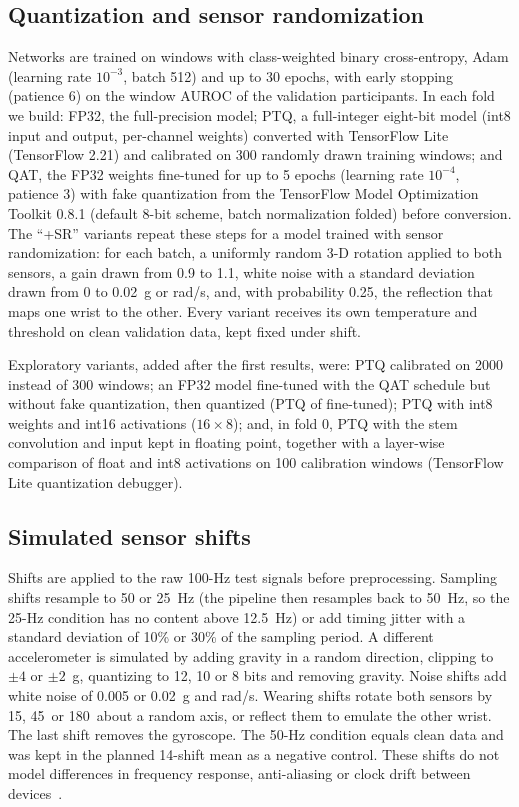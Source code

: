 \documentclass[preprint,12pt]{elsarticle}
\begin{document}
\subsection{Quantization and sensor randomization}
Networks are trained on windows with class-weighted binary cross-entropy, Adam (learning rate $10^{-3}$, batch 512) and up to 30 epochs, with early stopping (patience 6) on the window AUROC of the validation participants. In each fold we build: FP32, the full-precision model; PTQ, a full-integer eight-bit model (int8 input and output, per-channel weights) converted with TensorFlow Lite (TensorFlow 2.21) and calibrated on 300 randomly drawn training windows; and QAT, the FP32 weights fine-tuned for up to 5 epochs (learning rate $10^{-4}$, patience 3) with fake quantization from the TensorFlow Model Optimization Toolkit 0.8.1 (default 8-bit scheme, batch normalization folded) before conversion. The ``+SR'' variants repeat these steps for a model trained with sensor randomization: for each batch, a uniformly random 3-D rotation applied to both sensors, a gain drawn from 0.9 to 1.1, white noise with a standard deviation drawn from 0 to 0.02~g or rad/s, and, with probability 0.25, the reflection that maps one wrist to the other. Every variant receives its own temperature and threshold on clean validation data, kept fixed under shift.

Exploratory variants, added after the first results, were: PTQ calibrated on 2000 instead of 300 windows; an FP32 model fine-tuned with the QAT schedule but without fake quantization, then quantized (PTQ of fine-tuned); PTQ with int8 weights and int16 activations ($16\times8$); and, in fold 0, PTQ with the stem convolution and input kept in floating point, together with a layer-wise comparison of float and int8 activations on 100 calibration windows (TensorFlow Lite quantization debugger).

\subsection{Simulated sensor shifts}
Shifts are applied to the raw 100-Hz test signals before preprocessing. Sampling shifts resample to 50 or 25~Hz (the pipeline then resamples back to 50~Hz, so the 25-Hz condition has no content above 12.5~Hz) or add timing jitter with a standard deviation of 10\% or 30\% of the sampling period. A different accelerometer is simulated by adding gravity in a random direction, clipping to $\pm4$ or $\pm2$~g, quantizing to 12, 10 or 8 bits and removing gravity. Noise shifts add white noise of 0.005 or 0.02~g and rad/s. Wearing shifts rotate both sensors by 15\textdegree, 45\textdegree\ or 180\textdegree\ about a random axis, or reflect them to emulate the other wrist. The last shift removes the gyroscope. The 50-Hz condition equals clean data and was kept in the planned 14-shift mean as a negative control. These shifts do not model differences in frequency response, anti-aliasing or clock drift between devices~\cite{CoyleAsbil2026}.
\end{document}
